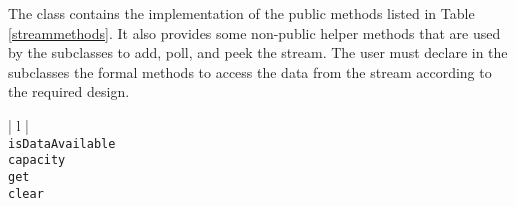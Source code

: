 The \Stream{} class contains the implementation of the public methods listed in Table \ref{streammethods}. 
It also provides some non-public helper methods that are used by the subclasses to add, poll, and peek the 
stream. The user must declare in the subclasses the formal methods to access the data from the stream 
according to the required design. 

\begin{table}[ht]
\caption{Public methods in the \Stream{} class}
\begin{center}
\begin{tabular}{| l |}
	\hline 
	 \\
	\hline \hline
	\texttt{isDataAvailable} \\
	\texttt{capacity} \\
	\texttt{get} \\
	\texttt{clear} \\
	\hline
\end{tabular}
\end{center}
\label{streammethods}
\end{table}